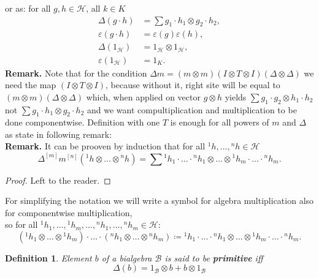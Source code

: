 \documentclass[a4paper, 12pt]{report}
\newtheorem{definition}{Definition}
\begin{document}
or as: for all $g, h \in \mathcal{H}$, all $k \in K$
\begin{align*}
\Delta(g \cdot h) &= \sum g_1 \cdot h_1 \otimes g_2 \cdot h_2, \\
\varepsilon(g \cdot h) &= \varepsilon(g)\varepsilon(h), \\
\Delta (1_\mathcal{H}) &= 1_\mathcal{H} \otimes 1_\mathcal{H}, \\
\varepsilon (1_\mathcal{H}) &= 1_K.
\end{align*}
\textbf{Remark. } Note that for the condition
$\Delta m = (m\otimes m)(I \otimes T \otimes I)(\Delta \otimes \Delta)$
we need the map $(I \otimes T \otimes I)$, because without it, right site will be equal to
$(m \otimes m)(\Delta \otimes \Delta)$ which, when applied on vector $g \otimes h$ yields
$\displaystyle\sum g_1 \cdot g_2 \otimes h_1 \cdot h_2$ not $\sum g_1 \cdot h_1 \otimes g_2 \cdot h_2$
and we want compultiplication and multiplication to be done componentwise. Definition with
one $T$ is enough for all powers of $m$ and $\Delta$ as state in following remark:\\
\textbf{Remark. } It can be prooven by induction that for all ${^1h}, \dots, {^nh} \in \mathcal{H}$
\begin{equation}
\Delta^{[m]}m^{[n]}({^1h} \otimes \dots \otimes {^nh}) = \sum {^1h}_1 \cdot \ldots \cdot {^nh}_1
\otimes \dots \otimes {^1h}_m\cdot  \ldots \cdot {^nh}_m.
\end{equation}
\begin{proof}
Left to the reader.
\end{proof}
For simplifying the notation we will write a symbol for algebra multiplication also for componentwise
multiplication, \\ so for all ${^1h}_1, \dots, {^1h}_m, \dots, {^nh}_1, \dots , {^nh}_m \in \mathcal{H}$:
\begin{equation}
({^1h}_1\otimes \dots \otimes {^1h}_m)\cdot \ldots \cdot ({^nh}_1 \otimes \dots \otimes {^nh}_m) \coloneqq
{^1h}_1 \cdot \ldots \cdot {^nh}_1 \otimes \dots \otimes {^1h}_m\cdot  \ldots \cdot {^nh}_m.
\end{equation}
\begin{definition}
Element $b$ of a bialgebra $\mathcal{B}$ is said to be \textbf{primitive} iff
\begin{equation*}
\Delta(b) = 1_\mathcal{B} \otimes b + b \otimes 1_\mathcal{B}
\end{equation*}
\end{definition}
\end{document}
